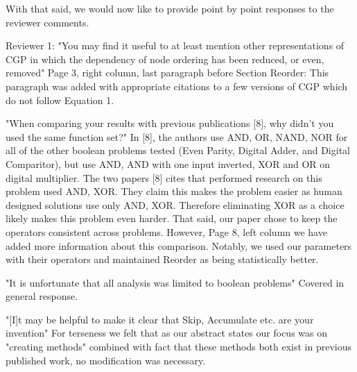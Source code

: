 \documentclass{letter}
\begin{document}
\begin{letter}{}
\begin{comment}
A major focus of our work (ordering effect on the location and number of active genes)
is grounded in theory which makes no assumptions on the type of problem being solved.
Furthermore, the operators we investigate deal with domain independent problems.
As the experimental results matched the theory, we have no reason to suspect our
conclusions on these topics to change when the operators or data type is changed.
However, we understand that the following could change depending on data type: The relative effectiveness
of the proposed modifications (IE, skip vs single, reorder vs normal, etc), the
evolved genome sizes, and the charts in Table IV and Table V.  Yet we do not feel
these are the primary concern of the work, nor do we have any reason to believe
the conclusions should only hold true for binary problems.
\end{comment}

With that said, we would now like to provide point by point responses to the reviewer
comments.

Reviewer 1:
"You may find it useful to at least mention other representations of CGP in
which the dependency of node ordering has been reduced, or even, removed"
Page 3, right column, last paragraph before Section Reorder: This paragraph was
added with appropriate citations to a few versions of CGP which do not follow Equation 1.

"When comparing your results with previous publications [8], why didn't you used the same function set?"
In [8], the authors use AND, OR, NAND, NOR for all of the other boolean problems tested (Even Parity, Digital Adder, and Digital Comparitor),
but use AND, AND with one input inverted, XOR and OR on digital multiplier.
The two papers [8] cites that performed research on this problem used AND, XOR.  They claim this makes the problem easier as
human designed solutions use only AND, XOR.  Therefore eliminating XOR as a choice likely makes this problem even harder.
That said, our paper chose to keep the operators consistent across problems.
However, Page 8, left column we have added more
information about this comparison.  Notably, we used our parameters with their operators
and maintained Reorder as being statistically better.

"It is unfortunate that all analysis was limited to boolean problems"
Covered in general response.

"[I]t may be helpful to make it clear that Skip, Accumulate etc. are your invention"
For terseness we felt that as our abstract states our focus was on "creating methods"
combined with fact that these methods both exist in previous published work, no modification
was necessary.


\end{letter}
\end{document}

